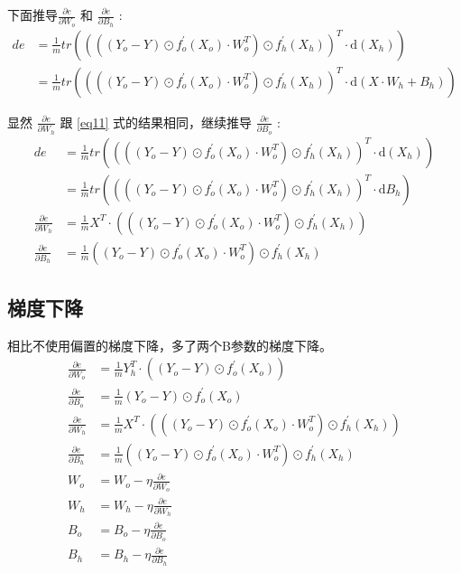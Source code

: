 \documentclass[12pt, a4paper, oneside]{ctexart}
\begin{document}
下面推导$\frac{\partial e}{\partial W_o}$ 和 $ \frac{\partial e}{\partial B_h} $ :
\begin{align}
    de &= \frac{1}{m}tr((((Y_o - Y) \odot f_o^{'}(X_o) \cdot W_o^T) \odot f_h^{'}(X_h))^T \cdot \mathrm{d}(X_h) ) \nonumber \\
    &= \frac{1}{m}tr((((Y_o - Y) \odot f_o^{'}(X_o) \cdot W_o^T) \odot f_h^{'}(X_h))^T \cdot \mathrm{d}(X \cdot W_h + B_h) )  \nonumber
\end{align}

显然 $\frac{\partial e}{\partial W_h}$ 跟 \eqref{eq11} 式的结果相同，继续推导 $ \frac{\partial e}{\partial B_o} $ :
\begin{align}
    de &= \frac{1}{m}tr((((Y_o - Y) \odot f_o^{'}(X_o) \cdot W_o^T) \odot f_h^{'}(X_h))^T \cdot \mathrm{d}(X_h) ) \nonumber \\
    &= \frac{1}{m}tr((((Y_o - Y) \odot f_o^{'}(X_o) \cdot W_o^T) \odot f_h^{'}(X_h))^T \cdot \mathrm{d}B_h )  \nonumber\\    
    \frac{\partial e}{\partial W_h} &= \frac{1}{m}X^T \cdot (((Y_o - Y) \odot f_o^{'}(X_o) \cdot W_o^T) \odot f_h^{'}(X_h))  \nonumber\\
    \frac{\partial e}{\partial B_h} &= \frac{1}{m}((Y_o - Y) \odot f_o^{'}(X_o) \cdot W_o^T) \odot f_h^{'}(X_h) \nonumber
\end{align}
\subsection{梯度下降}
相比不使用偏置的梯度下降，多了两个B参数的梯度下降。
\begin{align}    
    \frac{\partial e}{\partial W_o} &= \frac{1}{m}Y_h^T \cdot ((Y_o - Y) \odot f_o^{'}(X_o))    \nonumber \\
    \frac{\partial e}{\partial B_o} &= \frac{1}{m}(Y_o - Y) \odot f_o^{'}(X_o) \nonumber \\
    \frac{\partial e}{\partial W_h} &= \frac{1}{m}X^T \cdot (((Y_o - Y) \odot f_o^{'}(X_o) \cdot W_o^T) \odot f_h^{'}(X_h))  \nonumber \\
    \frac{\partial e}{\partial B_h} &= \frac{1}{m}((Y_o - Y) \odot f_o^{'}(X_o) \cdot W_o^T) \odot f_h^{'}(X_h) \nonumber \\
    W_o &= W_o - \eta\frac{\partial e}{\partial W_o} \nonumber \\
    W_h &= W_h - \eta\frac{\partial e}{\partial W_h} \nonumber \\
    B_o &= B_o - \eta\frac{\partial e}{\partial B_o} \nonumber \\
    B_h &= B_h - \eta\frac{\partial e}{\partial B_h} \nonumber 
\end{align}
\end{document}
